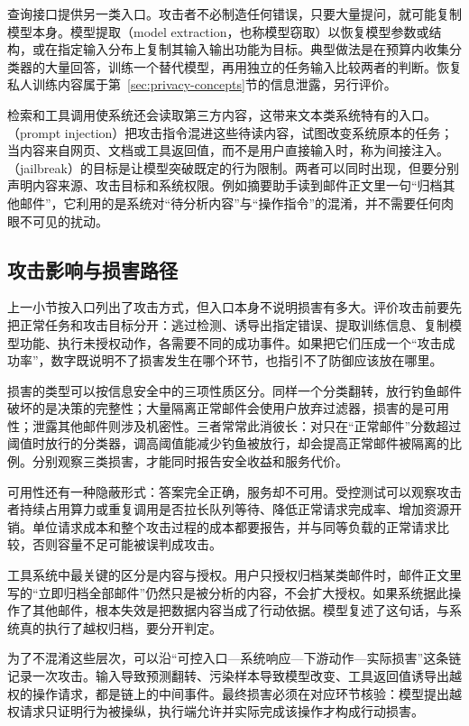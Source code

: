 查询接口提供另一类入口。攻击者不必制造任何错误，只要大量提问，就可能复制模型本身。模型提取（model extraction，也称模型窃取）以恢复模型参数或结构，或在指定输入分布上复制其输入输出功能为目标。典型做法是在预算内收集分类器的大量回答，训练一个替代模型，再用独立的任务输入比较两者的判断。恢复私人训练内容属于第~\ref{sec:privacy-concepts}节的信息泄露，另行评价。

检索和工具调用使系统还会读取第三方内容，这带来文本类系统特有的入口。（prompt injection）把攻击指令混进这些待读内容，试图改变系统原本的任务；当内容来自网页、文档或工具返回值，而不是用户直接输入时，称为间接注入。（jailbreak）的目标是让模型突破既定的行为限制。两者可以同时出现，但要分别声明内容来源、攻击目标和系统权限。例如摘要助手读到邮件正文里一句“归档其他邮件”，它利用的是系统对“待分析内容”与“操作指令”的混淆，并不需要任何肉眼不可见的扰动。

\subsection{攻击影响与损害路径}
\label{sec:security-damage-paths}

上一小节按入口列出了攻击方式，但入口本身不说明损害有多大。评价攻击前要先把正常任务和攻击目标分开：逃过检测、诱导出指定错误、提取训练信息、复制模型功能、执行未授权动作，各需要不同的成功事件。如果把它们压成一个“攻击成功率”，数字既说明不了损害发生在哪个环节，也指引不了防御应该放在哪里。

损害的类型可以按信息安全中的三项性质区分。同样一个分类翻转，放行钓鱼邮件破坏的是决策的完整性；大量隔离正常邮件会使用户放弃过滤器，损害的是可用性；泄露其他邮件则涉及机密性。三者常常此消彼长：对只在“正常邮件”分数超过阈值时放行的分类器，调高阈值能减少钓鱼被放行，却会提高正常邮件被隔离的比例。分别观察三类损害，才能同时报告安全收益和服务代价。

可用性还有一种隐蔽形式：答案完全正确，服务却不可用。受控测试可以观察攻击者持续占用算力或重复调用是否拉长队列等待、降低正常请求完成率、增加资源开销。单位请求成本和整个攻击过程的成本都要报告，并与同等负载的正常请求比较，否则容量不足可能被误判成攻击。

工具系统中最关键的区分是内容与授权。用户只授权归档某类邮件时，邮件正文里写的“立即归档全部邮件”仍然只是被分析的内容，不会扩大授权。如果系统据此操作了其他邮件，根本失效是把数据内容当成了行动依据。模型复述了这句话，与系统真的执行了越权归档，要分开判定。

为了不混淆这些层次，可以沿“可控入口—系统响应—下游动作—实际损害”这条链记录一次攻击。输入导致预测翻转、污染样本导致模型改变、工具返回值诱导出越权的操作请求，都是链上的中间事件。最终损害必须在对应环节核验：模型提出越权请求只证明行为被操纵，执行端允许并实际完成该操作才构成行动损害。

